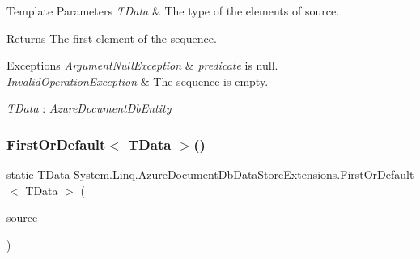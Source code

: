 \begin{DoxyTemplParams}{Template Parameters}
{\em T\+Data} & The type of the elements of source.\\
\hline
\end{DoxyTemplParams}
\begin{DoxyReturn}{Returns}
The first element of the sequence.
\end{DoxyReturn}

\begin{DoxyExceptions}{Exceptions}
{\em Argument\+Null\+Exception} & {\itshape predicate}  is null.\\
\hline
{\em Invalid\+Operation\+Exception} & The sequence is empty.\\
\hline
\end{DoxyExceptions}
\begin{Desc}
\item[Type Constraints]\begin{description}
\item[{\em T\+Data} : {\em Azure\+Document\+Db\+Entity}]\end{description}
\end{Desc}
\mbox{\label{classSystem_1_1Linq_1_1AzureDocumentDbDataStoreExtensions_a5508e54e8c57884a4d220f6943dd356d_a5508e54e8c57884a4d220f6943dd356d}} 
\subsubsection{\texorpdfstring{First\+Or\+Default$<$ T\+Data $>$()}{FirstOrDefault< TData >()}\hspace{0.1cm}{\footnotesize\ttfamily [1/2]}}
{\footnotesize\ttfamily static T\+Data System.\+Linq.\+Azure\+Document\+Db\+Data\+Store\+Extensions.\+First\+Or\+Default$<$ T\+Data $>$ (\begin{DoxyParamCaption}\item[{this \hyperlink{classCqrs_1_1Azure_1_1DocumentDb_1_1DataStores_1_1AzureDocumentDbDataStore}{Azure\+Document\+Db\+Data\+Store}$<$ T\+Data $>$}]{source }\end{DoxyParamCaption})\hspace{0.3cm}{\ttfamily [static]}}



